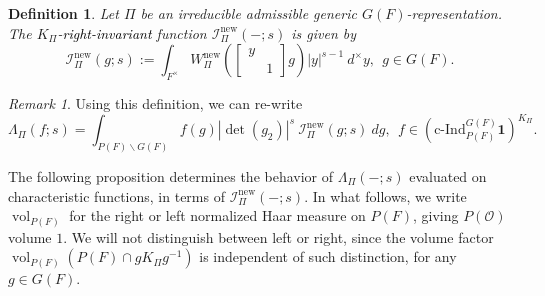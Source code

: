 \documentclass{amsart}
\theoremstyle{plain}
\theoremstyle{plain}
\newtheorem{defn}[thm]{Definition}
\theoremstyle{remark}
\newtheorem{rem}[thm]{Remark}
\DeclareMathOperator{\vol}{vol}
\begin{document}
\begin{defn}

    Let $\Pi$ be an irreducible admissible generic $G(F)$-representation. The $K_\Pi$-\textcolor{black}{right-invariant} function $\mathcal{I}_\Pi^\mathrm{new}(-;s)$ is given by
    $$\mathcal{I}_\Pi^\mathrm{new}(g;s):=\int_{F^\times}W_\Pi^\mathrm{new}(\left[\begin{smallmatrix}
        y & \\
        & 1
    \end{smallmatrix}\right]g)|y|^{s-1}\ d^\times y,\ \ g\in G(F).$$
\end{defn}
\begin{rem}
    Using this definition, we can re-write 
    $$\Lambda_\Pi(f;s)=\int_{P(F)\backslash G(F)}f(g)|\det(g_2)|^s\ \mathcal{I}_\Pi^\mathrm{new}(g;s)\ dg,\ \ f\in \left(\mathrm{c}\text{-}\mathrm{Ind}_{P(F)}^{G(F)}\mathbf{1}\right)^{K_\Pi}.$$
\end{rem}
\noindent The following proposition determines the behavior of $\Lambda_\Pi(-;s)$ evaluated on characteristic functions, in terms of $\mathcal{I}_\Pi^\mathrm{new}(-;s)$. In what follows, we write $\vol_{P(F)}$ for the right or left normalized Haar measure on $P(F)$, giving $P(\mathcal{O})$ volume $1$. We will not distinguish between left or right, since the volume factor $\vol_{P(F)}(P(F)\cap gK_\Pi g^{-1})$ is independent of such distinction, for any $g\in G(F)$.
\end{document}
